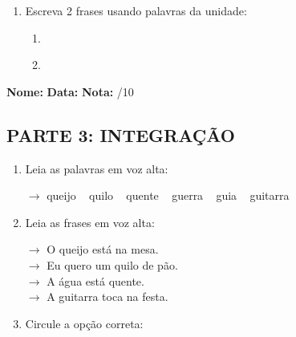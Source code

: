 \begin{exercicio}
\begin{enumerate}[resume]
  \item Escreva 2 frases usando palavras da unidade:
  \begin{enumerate}[label=\alph*)]
    \item \underline{\hspace{8cm}}
    \item \underline{\hspace{8cm}}
  \end{enumerate}

\end{enumerate}

\end{exercicio}



\begin{exercicio}

\noindent\textbf{Nome:} \underline{\hspace{3.2cm}} \quad \textbf{Data:} \underline{\hspace{1.6cm}} \quad \textbf{Nota:} \underline{\hspace{0.9cm}}/10


\subsection*{PARTE 3: INTEGRAÇÃO}

\begin{enumerate}[resume]

  \item Leia as palavras em voz alta:
  \begin{center}
  $\rightarrow$ queijo ~ quilo ~ quente ~ guerra ~ guia ~ guitarra
  \end{center}

  \item Leia as frases em voz alta:
  \begin{center}
  $\rightarrow$ O queijo está na mesa.\\
  $\rightarrow$ Eu quero um quilo de pão.\\
  $\rightarrow$ A água está quente.\\
  $\rightarrow$ A guitarra toca na festa.\\
  \end{center}

  \item Circule a opção correta:
  \begin{enumerate}[label=(\alph*)]


\end{enumerate}
\end{enumerate}
\end{exercicio}
